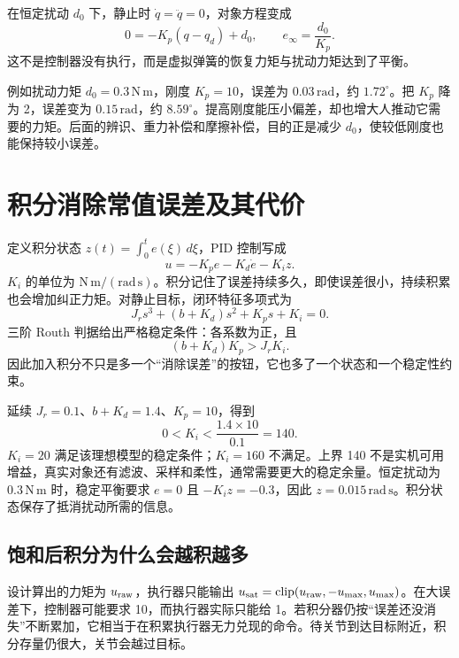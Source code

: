 在恒定扰动 $d_0$ 下，静止时 $\dot q=\ddot q=0$，对象方程变成
\begin{equation}
0=-K_p(q-q_d)+d_0,\qquad e_\infty=\frac{d_0}{K_p}.
\end{equation}
这不是控制器没有执行，而是虚拟弹簧的恢复力矩与扰动力矩达到了平衡。

例如扰动力矩 $d_0=0.3\,\mathrm{N\,m}$，刚度 $K_p=10$，误差为 $0.03\,\mathrm{rad}$，约 $1.72^\circ$。把 $K_p$ 降为 2，误差变为 $0.15\,\mathrm{rad}$，约 $8.59^\circ$。提高刚度能压小偏差，却也增大人推动它需要的力矩。后面的辨识、重力补偿和摩擦补偿，目的正是减少 $d_0$，使较低刚度也能保持较小误差。

\section{积分消除常值误差及其代价}

定义积分状态 $z(t)=\int_0^t e(\xi)\,d\xi$，PID 控制写成
\begin{equation}
u=-K_pe-K_d\dot e-K_iz.
\end{equation}
$K_i$ 的单位为 $\mathrm{N\,m/(rad\,s)}$。积分记住了误差持续多久，即使误差很小，持续积累也会增加纠正力矩。对静止目标，闭环特征多项式为
\begin{equation}
J_rs^3+(b+K_d)s^2+K_ps+K_i=0.
\end{equation}
三阶 Routh 判据给出严格稳定条件：各系数为正，且
\begin{equation}
(b+K_d)K_p>J_rK_i.
\end{equation}
因此加入积分不只是多一个“消除误差”的按钮，它也多了一个状态和一个稳定性约束。

\begin{examplebox}[算例 11C 积分增益不是越大越好]
延续 $J_r=0.1$、$b+K_d=1.4$、$K_p=10$，得到
\[
0<K_i<\frac{1.4\times10}{0.1}=140.
\]
$K_i=20$ 满足该理想模型的稳定条件；$K_i=160$ 不满足。上界 140 不是实机可用增益，真实对象还有滤波、采样和柔性，通常需要更大的稳定余量。恒定扰动为 $0.3\,\mathrm{N\,m}$ 时，稳定平衡要求 $e=0$ 且 $-K_i z=-0.3$，因此 $z=0.015\,\mathrm{rad\,s}$。积分状态保存了抵消扰动所需的信息。
\end{examplebox}

\subsection{饱和后积分为什么会越积越多}

设计算出的力矩为 $u_{\rm raw}$，执行器只能输出 $u_{\rm sat}=\operatorname{clip}(u_{\rm raw},-u_{\max},u_{\max})$。在大误差下，控制器可能要求 10，而执行器实际只能给 1。若积分器仍按“误差还没消失”不断累加，它相当于在积累执行器无力兑现的命令。待关节到达目标附近，积分存量仍很大，关节会越过目标。

